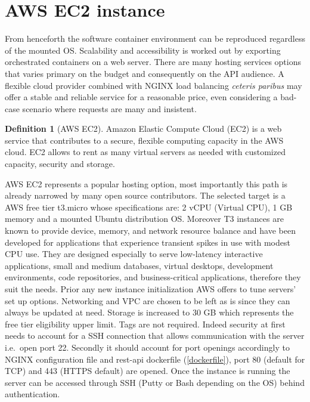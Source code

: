 \documentclass[
  12pt,
  a4paper,
  oneside]{book}
\theoremstyle{definition}
\newtheorem{definition}{Definition}[chapter]
\theoremstyle{definition}
\theoremstyle{definition}
\theoremstyle{remark}
\begin{document}
\hypertarget{aws}{%
\section{AWS EC2 instance}\label{aws}}

From henceforth the software container environment can be reproduced regardless of the mounted OS. Scalability and accessibility is worked out by exporting orchestrated containers on a web server. There are many hosting services options that varies primary on the budget and consequently on the API audience. A flexible cloud provider combined with NGINX load balancing \emph{ceteris paribus} may offer a stable and reliable service for a reasonable price, even considering a bad-case scenario where requests are many and insistent.
\begin{definition}[AWS EC2]
\protect\hypertarget{def:aws}{}{\label{def:aws} {} }Amazon Elastic Compute Cloud (EC2) is a web service that contributes to a secure, flexible computing capacity in the AWS cloud. EC2 allows to rent as many virtual servers as needed with customized capacity, security and storage.
\end{definition}

AWS EC2 represents a popular hosting option, most importantly this path is already narrowed by many open source contributors. The selected target is a AWS free tier t3.micro whose specifications are: 2 vCPU (Virtual CPU), 1 GB memory and a mounted Ubuntu distribution OS. Moreover T3 instances are known to provide device, memory, and network resource balance and have been developed for applications that experience transient spikes in use with modest CPU use. They are designed especially to serve low-latency interactive applications, small and medium databases, virtual desktops, development environments, code repositories, and business-critical applications, therefore they suit the needs.
Prior any new instance initialization AWS offers to tune servers' set up options. Networking and VPC are chosen to be left as is since they can always be updated at need. Storage is increased to 30 GB which represents the free tier eligibility upper limit. Tags are not required. Indeed security at first needs to account for a SSH connection that allows communication with the server i.e.~open port 22. Secondly it should account for port openings accordingly to NGINX configuration file and rest-api dockerfile (\ref{dockerfile}), port 80 (default for TCP) and 443 (HTTPS default) are opened. Once the instance is running the server can be accessed through SSH (Putty or Bash depending on the OS) behind authentication.
\end{document}
